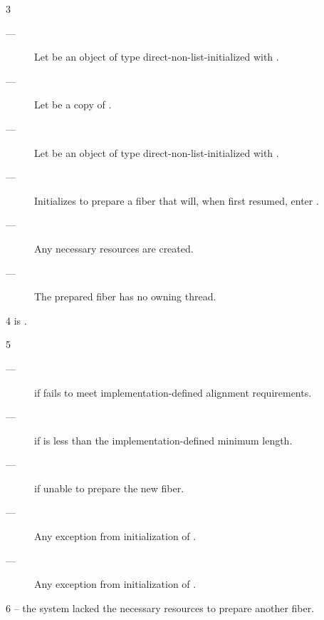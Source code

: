 3 \effects
\begin{description}
    \item[---] Let  be an object of
               type  direct-non-list-initialized
               with . 
    \item[---] Let  be a copy of .
    \item[---] Let  be an object of
               type  direct-non-list-initialized
               with . 
    \item[---] Initializes  to prepare a fiber that will, when
               first resumed, enter .
    \item[---] Any necessary resources are created.
    \item[---] The prepared fiber has no owning thread.
\end{description}

4 \postcond
\emptyfn is \false.

5 \except
\begin{description}
    \item[---]  if  fails to meet
               implementation-defined alignment requirements.
    \item[---]  if  is less than the
               implementation-defined minimum length.
    \item[---]  if unable to prepare the new fiber.
    \item[---] Any exception from initialization of .
    \item[---] Any exception from initialization of .
\end{description}

6 \errors
{} -- the system lacked the necessary resources to prepare another fiber.

